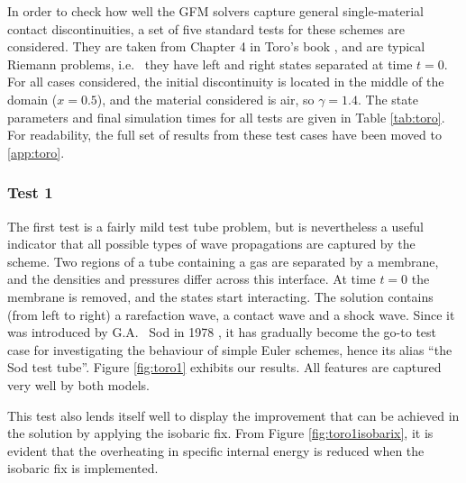 \documentclass[final,3p,twocolumn]{elsarticle}
\begin{document}
In order to check how well the GFM solvers capture general single-material
contact discontinuities, a set of five standard tests for these schemes are
considered. They are taken from Chapter 4 in Toro's book
\cite{toro2013riemann}, and are typical Riemann problems, i.e.~ they have left
and right states separated at time $t=0$. For all cases considered, the initial
discontinuity is located in the middle of the domain ($x=0.5$), and the
material considered is air, so $\gamma=1.4$.  The state parameters and final
simulation times for all tests are given in Table \ref{tab:toro}. For
readability, the full set of results from these test cases have been moved to
\ref{app:toro}. 

\subsubsection{Test 1}

The first test is a fairly mild test tube problem, but is nevertheless a useful
indicator that all possible types of wave propagations are captured by the
scheme. Two regions of a tube containing a gas are separated by a membrane, and
the densities and pressures differ across this interface. At time $t=0$ the
membrane is removed, and the states start interacting. The solution contains
(from left to right) a rarefaction wave, a contact wave and a shock wave. Since
it was introduced by G.A.~ Sod in 1978 \cite{sod1978survey}, it has gradually
become the go-to test case for investigating the behaviour of simple Euler
schemes, hence its alias ``the Sod test tube''. Figure \ref{fig:toro1} exhibits
our results. All features are captured very well by both models. 

This test also lends itself well to display the improvement that can be
achieved in the solution by applying the isobaric fix. From Figure
\ref{fig:toro1isobarix}, it is evident that the overheating in specific
internal energy is reduced when the isobaric fix is implemented. 

\end{document}
